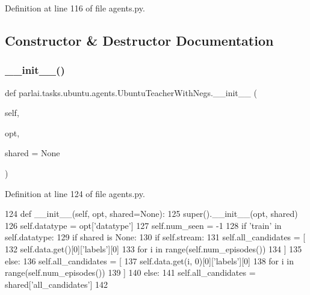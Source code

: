 Definition at line 116 of file agents.\+py.



\subsection{Constructor \& Destructor Documentation}
\mbox{\label{classparlai_1_1tasks_1_1ubuntu_1_1agents_1_1UbuntuTeacherWithNegs_a10a49844810d11e7aecf4b7854c81787}} 
\subsubsection{\texorpdfstring{\+\_\+\+\_\+init\+\_\+\+\_\+()}{\_\_init\_\_()}}
{\footnotesize\ttfamily def parlai.\+tasks.\+ubuntu.\+agents.\+Ubuntu\+Teacher\+With\+Negs.\+\_\+\+\_\+init\+\_\+\+\_\+ (\begin{DoxyParamCaption}\item[{}]{self,  }\item[{}]{opt,  }\item[{}]{shared = {\ttfamily None} }\end{DoxyParamCaption})}



Definition at line 124 of file agents.\+py.


\begin{DoxyCode}
124     \textcolor{keyword}{def }\_\_init\_\_(self, opt, shared=None):
125         super().\_\_init\_\_(opt, shared)
126         self.datatype = opt[\textcolor{stringliteral}{'datatype'}]
127         self.num\_seen = -1
128         \textcolor{keywordflow}{if} \textcolor{stringliteral}{'train'} \textcolor{keywordflow}{in} self.datatype:
129             \textcolor{keywordflow}{if} shared \textcolor{keywordflow}{is} \textcolor{keywordtype}{None}:
130                 \textcolor{keywordflow}{if} self.stream:
131                     self.all\_candidates = [
132                         self.data.get()[0][\textcolor{stringliteral}{'labels'}][0]
133                         \textcolor{keywordflow}{for} i \textcolor{keywordflow}{in} range(self.num\_episodes())
134                     ]
135                 \textcolor{keywordflow}{else}:
136                     self.all\_candidates = [
137                         self.data.get(i, 0)[0][\textcolor{stringliteral}{'labels'}][0]
138                         \textcolor{keywordflow}{for} i \textcolor{keywordflow}{in} range(self.num\_episodes())
139                     ]
140             \textcolor{keywordflow}{else}:
141                 self.all\_candidates = shared[\textcolor{stringliteral}{'all\_candidates'}]
142 
\end{DoxyCode}


